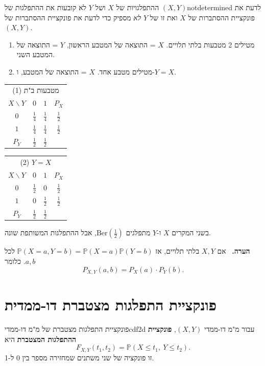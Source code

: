 \documentclass[11pt,a4paper]{report}
\newenvironment{remark}{\par\smallskip\noindent\textsf{\textbf{הערה.}}\ }{\par\smallskip}
\newcommand{\flag}{\tikz[baseline=-0.1ex,x=0.9ex,y=0.9ex]{\draw[line width=0.5pt] (0,-0.3)--(0,1.6); \fill (0,1.6)--(1.2,1.2)--(0,0.8)--cycle;}}
\newcounter{todo}
\newcommand{\addtodo}[1]{\refstepcounter{todo}%
  \addcontentsline{tdo}{todo}{\protect\numberline{\thetodo}#1}}
\newcommand{\needcheck}[1]{\addtodo{#1}%
  {\color{todoc}\sffamily\small\,[\textbf{\flag{}\,\thetodo\ לבדיקה:} #1]\,}}
\renewcommand{\needcheck}[1]{}
\newcommand{\PP}{\mathbb{P}}
\newcommand{\Ber}{\mathrm{Ber}}
\begin{document}
\begin{example}{ההתפלגויות של $X$ ושל $Y$ לא קובעות את ההתפלגות של $(X,Y)$}{notdetermined}
לדעת את פונקציית ההסתברות של $X$ ואת זו של $Y$ \emph{לא} מספיק כדי לדעת את פונקציית ההסתברות של $(X,Y)$.
\begin{enumerate}
  \item מטילים 2 מטבעות בלתי תלויים. $X$ = התוצאה של המטבע הראשון, $Y$ = התוצאה של המטבע השני.
  \item מטילים מטבע אחד. $X$ = התוצאה של המטבע, ו-$Y=X$.
\end{enumerate}
\begin{center}
\renewcommand{\arraystretch}{1.4}
\begin{tabular}{c|cc|c}
  \multicolumn{4}{c}{\small (1) מטבעות ב"ת}\\[2pt]
  $X\backslash Y$ & $0$ & $1$ & $P_X$\\ \hline
  $0$ & $\frac14$ & $\frac14$ & $\frac12$\\
  $1$ & $\frac14$ & $\frac14$ & $\frac12$\\ \hline
  $P_Y$ & $\frac12$ & $\frac12$ &
\end{tabular}
\qquad\qquad
\begin{tabular}{c|cc|c}
  \multicolumn{4}{c}{\small (2) $Y=X$}\\[2pt]
  $X\backslash Y$ & $0$ & $1$ & $P_X$\\ \hline
  $0$ & $\frac12$ & $0$ & $\frac12$\\
  $1$ & $0$ & $\frac12$ & $\frac12$\\ \hline
  $P_Y$ & $\frac12$ & $\frac12$ &
\end{tabular}
\end{center}
בשני המקרים $X$ ו-$Y$ מתפלגים $\Ber(\frac12)$, אבל ההתפלגות המשותפת שונה.
\end{example}

\begin{remark}
אם $X,Y$ בלתי תלויים, אז $\PP(X=a,Y=b)=\PP(X=a)\PP(Y=b)$ לכל $a,b$. כלומר
\[
  P_{X,Y}(a,b)=P_X(a)\cdot P_Y(b).
\]
\end{remark}

\section{פונקציית התפלגות מצטברת דו-ממדית}

\begin{definition}{פונקציית התפלגות מצטברת של מ"מ דו-ממדי}{cdf2d}
עבור מ"מ דו-ממדי $(X,Y)$, \textbf{פונקציית ההתפלגות המצטברת} היא
\[
  F_{X,Y}(t_1,t_2)=\PP(X\le t_1,\ Y\le t_2).
\]
זו פונקציה של שני משתנים שמחזירה מספר בין 0 ל-1.
\end{definition}
\needcheck{ברשימות נכתב $E_{X,Y}(t_1,t_2)=\PP(X\le t_1,X\le t_2)$; תיקנתי ל-$F_{X,Y}$ ול-$Y\le t_2$}
\end{document}
